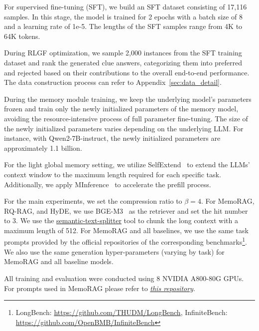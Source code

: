 \documentclass[sigconf]{acmart}
\begin{document}
For supervised fine-tuning (SFT), we build an SFT dataset consisting of 17,116 samples. In this stage, the model is trained for 2 epochs with a batch size of 8 and a learning rate of 1e-5. The lengths of the SFT samples range from 4K to 64K tokens.

During RLGF optimization, we sample 2,000 instances from the SFT training dataset and rank the generated clue answers, categorizing them into preferred and rejected based on their contributions to the overall end-to-end performance. The data construction process can refer to Appendix~\ref{sec:data_detail}.

During the memory module training, we keep the underlying model’s parameters frozen and train only the newly initialized parameters of the memory model, avoiding the resource-intensive process of full parameter fine-tuning. The size of the newly initialized parameters varies depending on the underlying LLM. For instance, with Qwen2-7B-instruct, the newly initialized parameters are approximately 1.1 billion.

For the light global memory setting, we utilize SelfExtend~\cite{jin2024llmmaybelonglmselfextend} to extend the LLMs’ context window to the maximum length required for each specific task. Additionally, we apply MInference~\cite{jiang2024minference} to accelerate the prefill process.

For the main experiments, we set the compression ratio to $\beta=4$. For MemoRAG, RQ-RAG, and HyDE, we use BGE-M3~\cite{bge_m3} as the retriever and set the hit number to 3. We use the \href{https://pypi.org/project/semantic-text-splitter/}{semantic-text-splitter} tool to chunk the long context with a maximum length of 512. For MemoRAG and all baselines, we use the same task prompts provided by the official repositories of the corresponding benchmarks\footnote{LongBench: \url{https://github.com/THUDM/LongBench}, InfiniteBench: \url{https://github.com/OpenBMB/InfiniteBench}}. We also use the same generation hyper-parameters (varying by task) for MemoRAG and all baseline models.

All training and evaluation were conducted using 8 NVIDIA A800-80G GPUs. For prompts used in MemoRAG please refer to \href{https://github.com/qhjqhj00/MemoRAG}{\textit{this repository}}.
\end{document}
